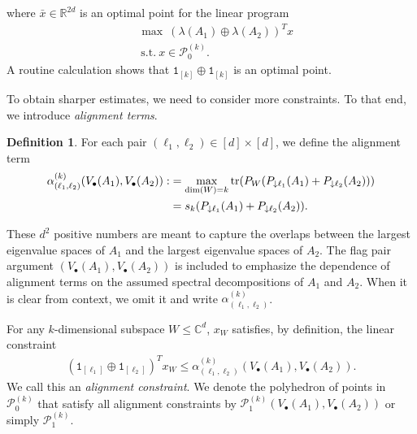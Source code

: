 \documentclass[12pt]{article}
\theoremstyle{definition}
\newtheorem{definition}[thm]{Definition}
\numberwithin{equation}{section}
\numberwithin{equation}{section}
\newcommand{\al}{\alpha}
\newcommand{\la}{\lambda}
\newcommand{\one}{\mathtt{1}}
\newcommand{\da}{\downarrow}
\newcommand{\cP}{\mathcal{P}}
\newcommand{\bC}{\mathbb{C}}
\newcommand{\bR}{\mathbb{R}}
\begin{document}
where \(\bar{x} \in \bR^{2d}\) is an optimal point for the linear program
\begin{equation}
\label{def: lin program}
\begin{aligned}
&\max \: (\la (A_1) \oplus \la(A_2))^T x\\
&\: \text{s.t.} \: x \in \cP_0^{(k)}.
\end{aligned}
\end{equation}
A routine calculation shows that \(\one_{[k]} \oplus \one_{[k]}\) is an optimal point. 





To obtain sharper estimates, we need to consider more constraints. To that end, we introduce \textit{alignment terms}. 
\begin{definition}
\label{def: alignment term}
For each pair \((\ell_1, \ell_2) \in [d] \times [d]\), we define the alignment term
\begin{align}
\label{def:  alignment quantity}
\al_{(\ell_1, \ell_2)}^{(k)} (V_\bullet(A_1), V_\bullet(A_2)) :&= \max_{\dim(W)=k} \tr(P_W (P_{\da \ell_1} (A_1) + P_{\da \ell_2} (A_2))) \\
&= s_k (P_{\da \ell_1} (A_1) + P_{\da \ell_2} (A_2)). 
\end{align}
\end{definition}


These \(d^2\) positive numbers are meant to capture the overlaps between the largest eigenvalue spaces of \(A_1\) and the largest eigenvalue spaces of \(A_2\). The flag pair argument \((V_\bullet(A_1), V_\bullet(A_2))\) is included to emphasize the dependence of alignment terms on the assumed spectral decompositions of \(A_1\) and \(A_2\). When it is clear from context, we omit it and write \(\al_{(\ell_1, \ell_2)}^{(k)}\). 



For any \(k\)-dimensional subspace \(W \leq \bC^d\), \(x_W\) satisfies, by definition, the linear constraint
\begin{align}
\label{ineq: alignment cons}
(\one_{[\ell_1]} \oplus \one_{[\ell_2]})^T x_W \leq \al_{(\ell_1, \ell_2)}^{(k)} (V_\bullet(A_1), V_\bullet(A_2)).
\end{align}
We call this an \textit{alignment constraint}. We denote the polyhedron of points in \(\cP_{0}^{(k)}\) that satisfy all alignment constraints by \(\cP_1^{(k)} (V_\bullet(A_1), V_\bullet(A_2))\) or simply \(\cP_1^{(k)}\).
\end{document}
